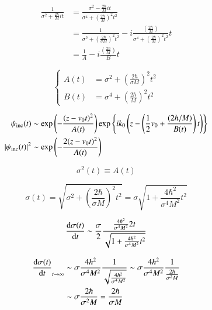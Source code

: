 \documentclass[a4paper,14pt]{book}
\begin{document}
\begin{equation}
\nonumber
\begin{split}
\frac{1}{\sigma^2 + \frac{2 \hbar}{M} i t} &= \frac{\sigma^2 - \frac{2 \hbar}{M} i t}{\sigma^4 + \left( \frac{2 \hbar}{M} \right)^2 t^2} \\
&= \frac{1}{\sigma^2 + \left( \frac{2 \hbar}{\sigma M} \right)^2 t^2} - i \frac{\left( \frac{2\hbar}{M} \right)}{\sigma^4 + \left( \frac{2 \hbar}{M} \right)^2 t^2} t \\
&= \frac{1}{A} - i \frac{\left( \frac{2\hbar}{M} \right)}{B} t
\end{split}
\end{equation}

\begin{equation}
\nonumber
\left\{
\begin{split}
A(t) &= \sigma^2 + \left( \frac{2\hbar}{\sigma M} \right)^2 t^2 \\
B(t) &= \sigma^4 + \left( \frac{2\hbar}{M} \right)^2 t^2
\end{split}
\right.
\end{equation}

\begin{equation}
\nonumber
\begin{split}
\psi_{\rm inc}(t) &\sim {\rm exp} \left( -\frac{(z - v_0 t)^2}{A(t)} \right) {\rm exp} \left\{ i k_0 \left( z - \left( \frac{1}{2} v_0 + \frac{(2 \hbar/M)}{B(t)} \right) t \right) \right\} \\
|\psi_{\rm inc}(t)|^2 &\sim {\rm exp} \left( - \frac{2 (z - v_0 t)^2}{A(t)} \right)
\end{split}
\end{equation}

\begin{equation}
\nonumber
\sigma^2(t) \equiv A(t)
\end{equation}

\begin{equation}
\nonumber
\sigma(t) = \sqrt{\sigma^2 + \left( \frac{2 \hbar}{\sigma M} \right)^2 t^2} = \sigma \sqrt{1 + \frac{4 \hbar^2}{\sigma^4 M^2} t^2}
\end{equation}

\begin{equation}
\nonumber
\frac{{\rm d}\sigma(t)}{{\rm d}t} \sim \frac{\sigma}{2} \frac{\frac{4 \hbar^2}{\sigma^4 M^2} 2 t}{\sqrt{1 + \frac{4 \hbar^2}{\sigma^4 M^2} t^2}}
\end{equation}

\begin{equation}
\nonumber
\begin{split}
\frac{{\rm d}\sigma(t)}{{\rm d}t}_{t \rightarrow \infty} &\sim \sigma \frac{4 \hbar^2}{\sigma^4 M^2} \frac{1}{\sqrt{\frac{4 \hbar^2}{\sigma^4 M^2}}} \sim \sigma \frac{4 \hbar^2}{\sigma^4 M^2} \frac{1}{\frac{2 \hbar}{\sigma^2 M}} \\
&\sim \sigma \frac{2 \hbar}{\sigma^2 M} = \frac{2 \hbar}{\sigma M}
\end{split}
\end{equation}
\end{document}
